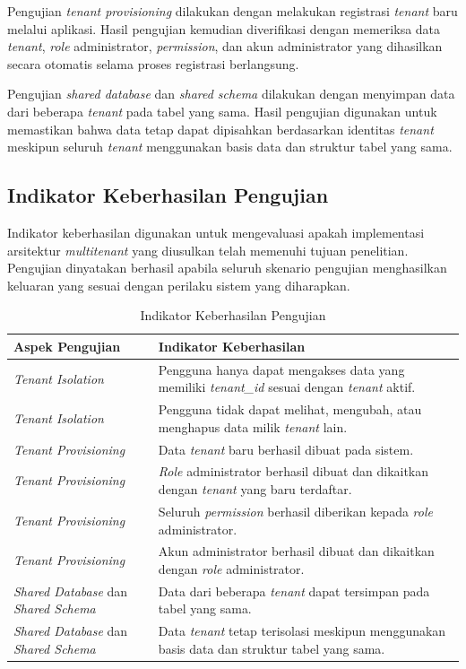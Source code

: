 Pengujian \textit{tenant provisioning} dilakukan dengan melakukan registrasi \textit{tenant} baru melalui aplikasi. Hasil pengujian kemudian diverifikasi dengan memeriksa data \textit{tenant}, \textit{role} administrator, \textit{permission}, dan akun administrator yang dihasilkan secara otomatis selama proses registrasi berlangsung.

Pengujian \textit{shared database} dan \textit{shared schema} dilakukan dengan menyimpan data dari beberapa \textit{tenant} pada tabel yang sama. Hasil pengujian digunakan untuk memastikan bahwa data tetap dapat dipisahkan berdasarkan identitas \textit{tenant} meskipun seluruh \textit{tenant} menggunakan basis data dan struktur tabel yang sama.

\subsection{Indikator Keberhasilan Pengujian}

Indikator keberhasilan digunakan untuk mengevaluasi apakah implementasi arsitektur \textit{multitenant} yang diusulkan telah memenuhi tujuan penelitian. Pengujian dinyatakan berhasil apabila seluruh skenario pengujian menghasilkan keluaran yang sesuai dengan perilaku sistem yang diharapkan.

\begin{table}[H]
  \centering
  \caption{Indikator Keberhasilan Pengujian}
  \label{tab:indikator_keberhasilan_pengujian}
  \footnotesize
  \begin{tabular}{|p{4cm}|p{9cm}|}
    \hline
    \rowcolor[HTML]{EFEFEF}
    \textbf{Aspek Pengujian} & \textbf{Indikator Keberhasilan} \\
    \hline
    \textit{Tenant Isolation} & Pengguna hanya dapat mengakses data yang memiliki \textit{tenant\_id} sesuai dengan \textit{tenant} aktif. \\
    \hline
    \textit{Tenant Isolation} & Pengguna tidak dapat melihat, mengubah, atau menghapus data milik \textit{tenant} lain. \\
    \hline
    \textit{Tenant Provisioning} & Data \textit{tenant} baru berhasil dibuat pada sistem. \\
    \hline
    \textit{Tenant Provisioning} & \textit{Role} administrator berhasil dibuat dan dikaitkan dengan \textit{tenant} yang baru terdaftar. \\
    \hline
    \textit{Tenant Provisioning} & Seluruh \textit{permission} berhasil diberikan kepada \textit{role} administrator. \\
    \hline
    \textit{Tenant Provisioning} & Akun administrator berhasil dibuat dan dikaitkan dengan \textit{role} administrator. \\
    \hline
    \textit{Shared Database} dan \textit{Shared Schema} & Data dari beberapa \textit{tenant} dapat tersimpan pada tabel yang sama. \\
    \hline
    \textit{Shared Database} dan \textit{Shared Schema} & Data \textit{tenant} tetap terisolasi meskipun menggunakan basis data dan struktur tabel yang sama. \\
    \hline
  \end{tabular}
\end{table}

